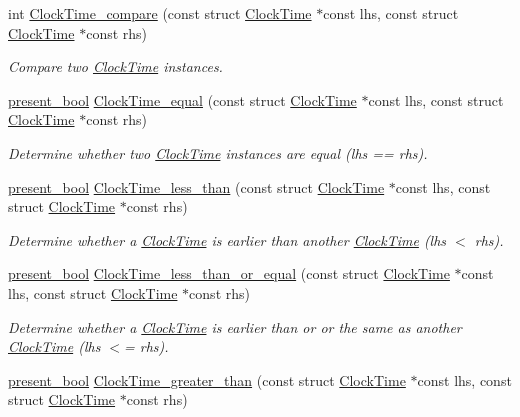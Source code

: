 \begin{DoxyCompactItemize}
int \hyperlink{clock-time_8h_a769989ae3695814b6f64b17ff059d76a}{Clock\-Time\-\_\-compare} (const struct \hyperlink{structClockTime}{Clock\-Time} $\ast$const lhs, const struct \hyperlink{structClockTime}{Clock\-Time} $\ast$const rhs)
\begin{DoxyCompactList}\small\item\em Compare two \hyperlink{structClockTime}{Clock\-Time} instances. \end{DoxyCompactList}\item 
\hyperlink{types_8h_a1c24e2cdd988b886e889080ded176ae0}{present\-\_\-bool} \hyperlink{clock-time_8h_aface5d0e8bf75acddb72475d76c4b1d8}{Clock\-Time\-\_\-equal} (const struct \hyperlink{structClockTime}{Clock\-Time} $\ast$const lhs, const struct \hyperlink{structClockTime}{Clock\-Time} $\ast$const rhs)
\begin{DoxyCompactList}\small\item\em Determine whether two \hyperlink{structClockTime}{Clock\-Time} instances are equal (lhs == rhs). \end{DoxyCompactList}\item 
\hyperlink{types_8h_a1c24e2cdd988b886e889080ded176ae0}{present\-\_\-bool} \hyperlink{clock-time_8h_ad0b394066f11e1f695bd10c2aad04ea0}{Clock\-Time\-\_\-less\-\_\-than} (const struct \hyperlink{structClockTime}{Clock\-Time} $\ast$const lhs, const struct \hyperlink{structClockTime}{Clock\-Time} $\ast$const rhs)
\begin{DoxyCompactList}\small\item\em Determine whether a \hyperlink{structClockTime}{Clock\-Time} is earlier than another \hyperlink{structClockTime}{Clock\-Time} (lhs $<$ rhs). \end{DoxyCompactList}\item 
\hyperlink{types_8h_a1c24e2cdd988b886e889080ded176ae0}{present\-\_\-bool} \hyperlink{clock-time_8h_a8725113f40fe7aae309480cc0b666c16}{Clock\-Time\-\_\-less\-\_\-than\-\_\-or\-\_\-equal} (const struct \hyperlink{structClockTime}{Clock\-Time} $\ast$const lhs, const struct \hyperlink{structClockTime}{Clock\-Time} $\ast$const rhs)
\begin{DoxyCompactList}\small\item\em Determine whether a \hyperlink{structClockTime}{Clock\-Time} is earlier than or or the same as another \hyperlink{structClockTime}{Clock\-Time} (lhs $<$= rhs). \end{DoxyCompactList}\item 
\hyperlink{types_8h_a1c24e2cdd988b886e889080ded176ae0}{present\-\_\-bool} \hyperlink{clock-time_8h_ae2c5d81af2ab38abf4248271cb45be33}{Clock\-Time\-\_\-greater\-\_\-than} (const struct \hyperlink{structClockTime}{Clock\-Time} $\ast$const lhs, const struct \hyperlink{structClockTime}{Clock\-Time} $\ast$const rhs)

\end{DoxyCompactItemize}

